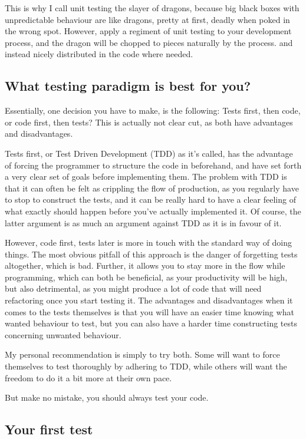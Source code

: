 \documentclass[10pt,a4paper]{article}
\begin{document}
This is why I call unit testing the slayer of dragons, because big black boxes with unpredictable behaviour are like dragons, pretty at first, deadly when poked in the wrong spot. However, apply a regiment of unit testing to your development process, and the dragon will be chopped to pieces naturally by the process. and instead nicely distributed in the code where needed. 

\subsection{What testing paradigm is best for you?}

Essentially, one decision you have to make, is the following: Tests first, then code, or code first, then tests? This is actually not clear cut, as both have advantages and disadvantages. 

Tests first, or Test Driven Development (TDD) as it's called, has the advantage of forcing the programmer to structure the code in beforehand, and have set forth a very clear set of goals before implementing them. The problem with TDD is that it can often be felt as crippling the flow of production, as you regularly have to stop to construct the tests, and it can be really hard to have a clear feeling of what exactly should happen before you've actually implemented it. Of course, the latter argument is as much an argument against TDD as it is in favour of it.

However, code first, tests later is more in touch with the standard way of doing things. The most obvious pitfall of this approach is the danger of forgetting tests altogether, which is bad. Further, it allows you to stay more in the flow while programming, which can both be beneficial, as your productivity will be high, but also detrimental, as you might produce a lot of code that will need refactoring once you start testing it. The advantages and disadvantages when it comes to the tests themselves is that you will have an easier time knowing what wanted behaviour to test, but you can also have a harder time constructing tests concerning unwanted behaviour. 

My personal recommendation is simply to try both. Some will want to force themselves to test thoroughly by adhering to TDD, while others will want the freedom to do it a bit more at their own pace.

But make no mistake, you should always test your code.

\subsection{Your first test}
\end{document}
